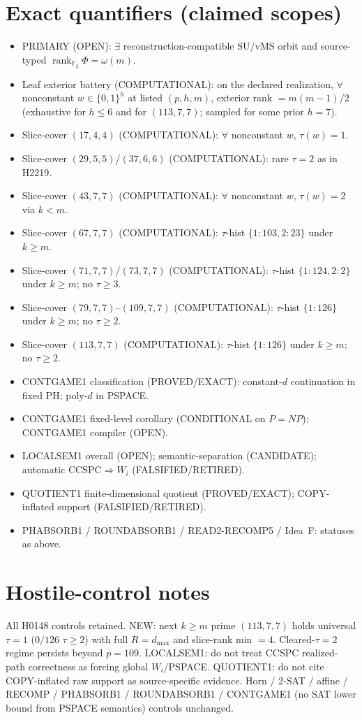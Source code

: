 \documentclass[11pt]{article}
\begin{document}
\section*{Exact quantifiers (claimed scopes)}
\begin{itemize}
\item PRIMARY (OPEN): $\exists$ reconstruction-compatible SU/vMS orbit and source-typed
  $\operatorname{rank}_{\mathbb F_2}\Phi=\omega(m)$.
\item Leaf exterior battery (COMPUTATIONAL): on the declared realization, $\forall$ nonconstant
  $w\in\{0,1\}^h$ at listed $(p,h,m)$, exterior rank $=m(m-1)/2$
  (exhaustive for $h\le6$ and for $(113,7,7)$; sampled for some prior $h{=}7$).
\item Slice-cover $(17,4,4)$ (COMPUTATIONAL): $\forall$ nonconstant $w$, $\tau(w)=1$.
\item Slice-cover $(29,5,5)$/$(37,6,6)$ (COMPUTATIONAL): rare $\tau{=}2$ as in H2219.
\item Slice-cover $(43,7,7)$ (COMPUTATIONAL): $\forall$ nonconstant $w$, $\tau(w)=2$ via $k{<}m$.
\item Slice-cover $(67,7,7)$ (COMPUTATIONAL): $\tau$-hist $\{1{:}103,2{:}23\}$ under $k{\ge}m$.
\item Slice-cover $(71,7,7)$/$(73,7,7)$ (COMPUTATIONAL): $\tau$-hist $\{1{:}124,2{:}2\}$ under $k{\ge}m$;
  no $\tau{\ge}3$.
\item Slice-cover $(79,7,7)$--$(109,7,7)$ (COMPUTATIONAL): $\tau$-hist $\{1{:}126\}$ under $k{\ge}m$;
  no $\tau{\ge}2$.
\item Slice-cover $(113,7,7)$ (COMPUTATIONAL): $\tau$-hist $\{1{:}126\}$ under $k{\ge}m$;
  no $\tau{\ge}2$.
\item CONTGAME1 classification (PROVED/EXACT): constant-$d$ continuation in fixed PH;
  poly-$d$ in PSPACE.
\item CONTGAME1 fixed-level corollary (CONDITIONAL on $P=NP$); CONTGAME1 compiler (OPEN).
\item LOCALSEM1 overall (OPEN); semantic-separation (CANDIDATE); automatic CCSPC$\Rightarrow W_i$ (FALSIFIED/RETIRED).
\item QUOTIENT1 finite-dimensional quotient (PROVED/EXACT); COPY-inflated support (FALSIFIED/RETIRED).
\item PHABSORB1 / ROUNDABSORB1 / READ2-RECOMP5 / Idea~F: statuses as above.
\end{itemize}

\section*{Hostile-control notes}
All H0148 controls retained. NEW: next $k{\ge}m$ prime $(113,7,7)$ holds universal
$\tau{=}1$ ($0/126$ $\tau{\ge}2$) with full $R{=}d_{\max}$ and slice-rank min $=4$.
Cleared-$\tau{=}2$ regime persists beyond $p{=}109$. LOCALSEM1: do not treat CCSPC
realized-path correctness as forcing global $W_i$/PSPACE. QUOTIENT1: do not cite COPY-inflated
raw support as source-specific evidence. Horn / 2-SAT / affine /
RECOMP / PHABSORB1 / ROUNDABSORB1 / CONTGAME1 (no SAT lower bound from PSPACE semantics)
controls unchanged.
\end{document}
